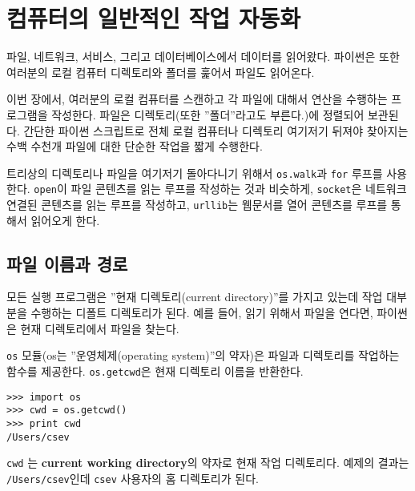 
\chapter{컴퓨터의 일반적인 작업 자동화}

파일, 네트워크, 서비스, 그리고 데이터베이스에서 데이터를 읽어왔다.
파이썬은 또한 여러분의 로컬 컴퓨터 디렉토리와 폴더를 훑어서 파일도 읽어온다.

이번 장에서, 여러분의 로컬 컴퓨터를 스캔하고 각 파일에 대해서 연산을 수행하는 프로그램을 작성한다.
파일은 디렉토리(또한 ''폴더''라고도 부른다.)에 정렬되어 보관된다. 
간단한 파이썬 스크립트로 전체 로컬 컴퓨터나 디렉토리 여기저기 뒤져야 찾아지는 수백 수천개 파일에 대한 단순한 작업을 짧게 수행한다. 

트리상의 디렉토리나 파일을 여기저기 돌아다니기 위해서 {\tt os.walk}과 {\tt for} 루프를 사용한다.
{\tt open}이 파일 콘텐츠를 읽는 루프를 작성하는 것과 비슷하게,
{\tt socket}은 네트워크 연결된 콘텐츠를 읽는 루프를 작성하고,
{\tt urllib}는 웹문서를 열어 콘텐츠를 루프를 통해서 읽어오게 한다. 

\section{파일 이름과 경로}
\label{paths}


모든 실행 프로그램은 ''현재 디렉토리(current directory)''를 가지고 있는데 작업 대부분을 수행하는 디폴트 디렉토리가 된다. 
예를 들어, 읽기 위해서 파일을 연다면, 파이썬은 현재 디렉토리에서 파일을 찾는다.


{\tt os} 모듈(os는 ''운영체제(operating system)''의 약자)은 파일과 디렉토리를 작업하는 함수를 제공한다.
{\tt os.getcwd}은 현재 디렉토리 이름을 반환한다.


\beforeverb
\begin{verbatim}
>>> import os
>>> cwd = os.getcwd()
>>> print cwd
/Users/csev
\end{verbatim}
\afterverb
%

{\tt cwd} 는 {\bf current working directory}의 약자로 현재 작업 디렉토리다.
예제의 결과는 {\tt /Users/csev}인데 {\tt csev} 사용자의 홈 디렉토리가 된다.

